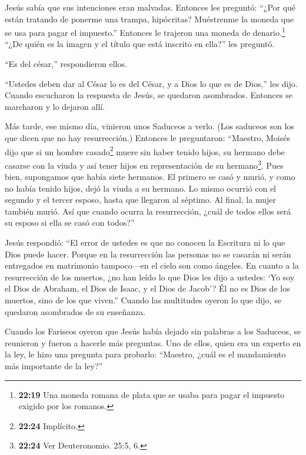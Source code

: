  Jesús sabía que sus intenciones eran malvadas. Entonces
les preguntó: ``¿Por qué están tratando de ponerme una trampa,
hipócritas?  Muéstrenme la moneda que se usa para pagar el
impuesto.'' Entonces le trajeron una moneda de denario.\footnote{\textbf{22:19}
  Una moneda romana de plata que se usaba para pagar el impuesto exigido
  por los romanos.}  ``¿De quién es la imagen y el título
que está inscrito en ella?'' les preguntó.

 ``Es del césar,'' respondieron ellos.

``Ustedes deben dar al César lo es del César, y a Dios lo que es de
Dios,'' les dijo.  Cuando escucharon la respuesta de Jesús,
se quedaron asombrados. Entonces se marcharon y lo dejaron allí.

 Más tarde, ese mismo día, vinieron unos Saduceos a verlo.
(Los saduceos son los que dicen que no hay resurrección.) 
Entonces le preguntaron: ``Maestro, Moisés dijo que si un hombre
casado\footnote{\textbf{22:24} Implícito.} muere sin haber tenido hijos,
su hermano debe casarse con la viuda y así tener hijos en representación
de su hermano\footnote{\textbf{22:24} Ver Deuteronomio. 25:5, 6.}.
 Pues bien, supongamos que había siete hermanos. El primero
se casó y murió, y como no había tenido hijos, dejó la viuda a su
hermano.  Lo mismo ocurrió con el segundo y el tercer
esposo, hasta que llegaron al séptimo.  Al final, la mujer
también murió.  Así que cuando ocurra la resurrección,
¿cuál de todos ellos será su esposo si ella se casó con todos?''

 Jesús respondió: ``El error de ustedes es que no conocen
la Escritura ni lo que Dios puede hacer.  Porque en la
resurrección las personas no se casarán ni serán entregados en
matrimonio tampoco---en el cielo son como ángeles.  En
cuanto a la resurrección de los muertos, ¿no han leído lo que Dios les
dijo a ustedes:  `Yo soy el Dios de Abraham, el Dios de
Isaac, y el Dios de Jacob'? Él no es Dios de los muertos, sino de los
que viven.''  Cuando las multitudes oyeron lo que dijo, se
quedaron asombrados de su enseñanza.

 Cuando los Fariseos oyeron que Jesús había dejado sin
palabras a los Saduceos, se reunieron y fueron a hacerle más preguntas.
 Uno de ellos, quien era un experto en la ley, le hizo una
pregunta para probarlo:  ``Maestro, ¿cuál es el mandamiento
más importante de la ley?''

